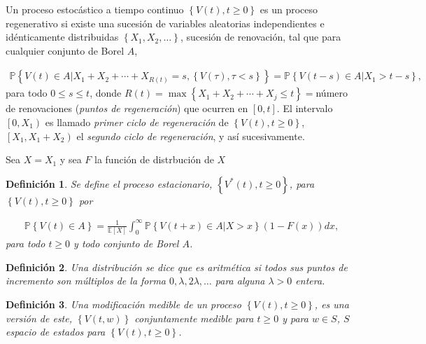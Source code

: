 \documentclass{article}
\newtheorem{Def}{Definición}[section]
\newcommand{\esp}{\mathbb{E}}
\newcommand{\prob}{\mathbb{P}}
\numberwithin{equation}{section}
\begin{document}
Un proceso estoc\'astico a tiempo continuo $\left\{V\left(t\right),t\geq0\right\}$ es un proceso regenerativo si existe una sucesi\'on de variables aleatorias independientes e id\'enticamente distribuidas $\left\{X_{1},X_{2},\ldots\right\}$, sucesi\'on de renovaci\'on, tal que para cualquier conjunto de Borel $A$, 

\begin{eqnarray*}
\prob\left\{V\left(t\right)\in A|X_{1}+X_{2}+\cdots+X_{R\left(t\right)}=s,\left\{V\left(\tau\right),\tau<s\right\}\right\}=\prob\left\{V\left(t-s\right)\in A|X_{1}>t-s\right\},
\end{eqnarray*}
para todo $0\leq s\leq t$, donde $R\left(t\right)=\max\left\{X_{1}+X_{2}+\cdots+X_{j}\leq t\right\}=$n\'umero de renovaciones ({\emph{puntos de regeneraci\'on}}) que ocurren en $\left[0,t\right]$. El intervalo $\left[0,X_{1}\right)$ es llamado {\emph{primer ciclo de regeneraci\'on}} de $\left\{V\left(t \right),t\geq0\right\}$, $\left[X_{1},X_{1}+X_{2}\right)$ el {\emph{segundo ciclo de regeneraci\'on}}, y as\'i sucesivamente.

Sea $X=X_{1}$ y sea $F$ la funci\'on de distrbuci\'on de $X$


\begin{Def}
Se define el proceso estacionario, $\left\{V^{*}\left(t\right),t\geq0\right\}$, para $\left\{V\left(t\right),t\geq0\right\}$ por

\begin{eqnarray*}
\prob\left\{V\left(t\right)\in A\right\}=\frac{1}{\esp\left[X\right]}\int_{0}^{\infty}\prob\left\{V\left(t+x\right)\in A|X>x\right\}\left(1-F\left(x\right)\right)dx,
\end{eqnarray*} 
para todo $t\geq0$ y todo conjunto de Borel $A$.
\end{Def}

\begin{Def}
Una distribuci\'on se dice que es {\emph{aritm\'etica}} si todos sus puntos de incremento son m\'ultiplos de la forma $0,\lambda, 2\lambda,\ldots$ para alguna $\lambda>0$ entera.
\end{Def}


\begin{Def}
Una modificaci\'on medible de un proceso $\left\{V\left(t\right),t\geq0\right\}$, es una versi\'on de este, $\left\{V\left(t,w\right)\right\}$ conjuntamente medible para $t\geq0$ y para $w\in S$, $S$ espacio de estados para $\left\{V\left(t\right),t\geq0\right\}$.
\end{Def}
\end{document}
